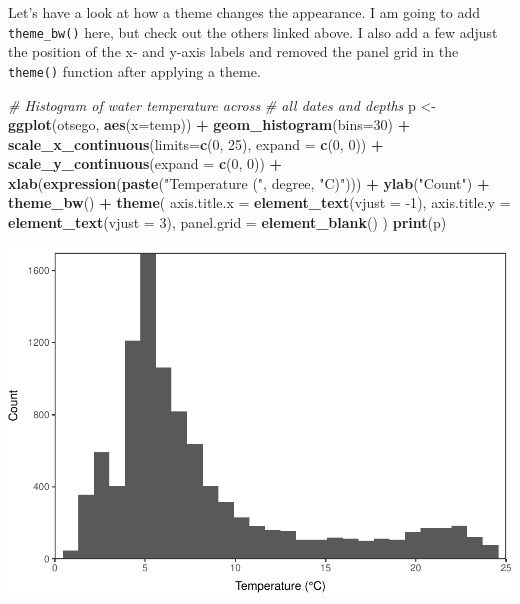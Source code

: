 \documentclass[
]{book}
\newenvironment{Shaded}{\begin{snugshade}}{\end{snugshade}}
\newcommand{\CommentTok}[1]{\textcolor[rgb]{0.56,0.35,0.01}{\textit{#1}}}
\newcommand{\DataTypeTok}[1]{\textcolor[rgb]{0.13,0.29,0.53}{#1}}
\newcommand{\DecValTok}[1]{\textcolor[rgb]{0.00,0.00,0.81}{#1}}
\newcommand{\KeywordTok}[1]{\textcolor[rgb]{0.13,0.29,0.53}{\textbf{#1}}}
\newcommand{\NormalTok}[1]{#1}
\newcommand{\OperatorTok}[1]{\textcolor[rgb]{0.81,0.36,0.00}{\textbf{#1}}}
\newcommand{\StringTok}[1]{\textcolor[rgb]{0.31,0.60,0.02}{#1}}
\begin{document}
Let's have a look at how a theme changes the appearance. I am going to add \texttt{theme\_bw()} here, but check out the others linked above. I also add a few adjust the position of the x- and y-axis labels and removed the panel grid in the \texttt{theme()} function after applying a theme.

\begin{Shaded}
\begin{Highlighting}[]
\CommentTok{# Histogram of water temperature across }
\CommentTok{# all dates and depths}
\NormalTok{p <-}\StringTok{ }\KeywordTok{ggplot}\NormalTok{(otsego, }\KeywordTok{aes}\NormalTok{(}\DataTypeTok{x=}\NormalTok{temp)) }\OperatorTok{+}\StringTok{ }
\StringTok{  }\KeywordTok{geom_histogram}\NormalTok{(}\DataTypeTok{bins=}\DecValTok{30}\NormalTok{) }\OperatorTok{+}\StringTok{ }
\StringTok{  }\KeywordTok{scale_x_continuous}\NormalTok{(}\DataTypeTok{limits=}\KeywordTok{c}\NormalTok{(}\DecValTok{0}\NormalTok{, }\DecValTok{25}\NormalTok{), }\DataTypeTok{expand =} \KeywordTok{c}\NormalTok{(}\DecValTok{0}\NormalTok{, }\DecValTok{0}\NormalTok{)) }\OperatorTok{+}\StringTok{ }
\StringTok{  }\KeywordTok{scale_y_continuous}\NormalTok{(}\DataTypeTok{expand =} \KeywordTok{c}\NormalTok{(}\DecValTok{0}\NormalTok{, }\DecValTok{0}\NormalTok{)) }\OperatorTok{+}\StringTok{ }
\StringTok{  }\KeywordTok{xlab}\NormalTok{(}\KeywordTok{expression}\NormalTok{(}\KeywordTok{paste}\NormalTok{(}\StringTok{"Temperature ("}\NormalTok{, degree, }\StringTok{"C)"}\NormalTok{))) }\OperatorTok{+}
\StringTok{  }\KeywordTok{ylab}\NormalTok{(}\StringTok{"Count"}\NormalTok{) }\OperatorTok{+}
\StringTok{  }\KeywordTok{theme_bw}\NormalTok{() }\OperatorTok{+}
\StringTok{  }\KeywordTok{theme}\NormalTok{(}
    \DataTypeTok{axis.title.x =} \KeywordTok{element_text}\NormalTok{(}\DataTypeTok{vjust =} \DecValTok{-1}\NormalTok{),}
    \DataTypeTok{axis.title.y =} \KeywordTok{element_text}\NormalTok{(}\DataTypeTok{vjust =} \DecValTok{3}\NormalTok{),}
    \DataTypeTok{panel.grid =} \KeywordTok{element_blank}\NormalTok{()}
\NormalTok{  )}
\KeywordTok{print}\NormalTok{(p)}
\end{Highlighting}
\end{Shaded}

\includegraphics{worstr_files/figure-latex/unnamed-chunk-102-1.pdf}
\end{document}
